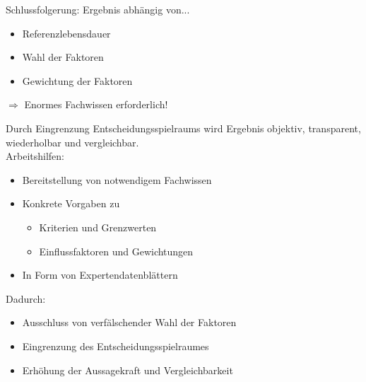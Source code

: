 \documentclass[fleqn,twoside,dvipsnames]{article}
\begin{document}
\begin{itemize}
\begin{itemize}
                    \begin{minipage}{0.5\textwidth}
                            \item Schlussfolgerung: Ergebnis abhängig von...
                                \begin{itemize}
                                    \item Referenzlebensdauer
                                    \item Wahl der Faktoren
                                    \item Gewichtung der Faktoren
                                \end{itemize}
                            $\Rightarrow$ Enormes Fachwissen erforderlich!
                            \item  Durch Eingrenzung Entscheidungsspielraums wird Ergebnis objektiv, transparent, wiederholbar und vergleichbar.\\
                            Arbeitshilfen:
                                \begin{itemize}
                                    \item Bereitstellung von notwendigem Fachwissen
                                    \item Konkrete Vorgaben zu
                                        \begin{itemize}
                                            \item Kriterien und Grenzwerten
                                            \item Einflussfaktoren und Gewichtungen
                                        \end{itemize}
                                    \item In Form von Expertendatenblättern
                                \end{itemize}
                            \item Dadurch:
                                \begin{itemize}
                                    \item Ausschluss von verfälschender Wahl der Faktoren
                                    \item Eingrenzung des Entscheidungsspielraumes
                                    \item Erhöhung der Aussagekraft und Vergleichbarkeit
                                \end{itemize}

\end{minipage}
\end{itemize}
\end{itemize}
\end{document}
